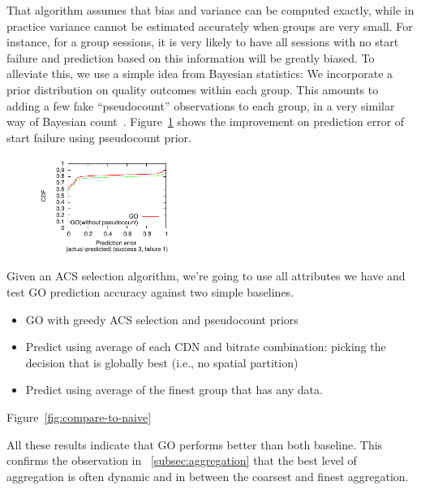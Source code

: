 That algorithm assumes that bias and variance can be computed exactly, while in practice variance cannot be estimated accurately when groups are very small. For instance, for a group sessions, it is very likely to have all sessions with no start failure and prediction based on this information will be greatly biased.
To alleviate this, we use a simple idea from Bayesian statistics: We incorporate a prior distribution on quality outcomes within each group.  This amounts to adding a few fake ``pseudocount'' observations to each group, in a very similar way of Bayesian count~\cite{}.  Figure~\ref{fig:sudocount} shows the improvement on prediction error of start failure using pseudocount prior.

\begin{figure}[h!]
\centering
 \includegraphics[width=0.4\textwidth] {figures/prediction-comparisons/example-pcount-metric3.pdf}
\label{fig:sudocount}
\end{figure}


Given an ACS selection algorithm, we're going to use all attributes we have and test GO prediction accuracy against two simple baselines.
\begin{itemize}
	\item GO with greedy ACS selection and pseudocount priors
	\item Predict using average of each CDN and bitrate combination: picking the decision that is globally best (i.e., no spatial partition)
	\item Predict using average of the finest group that has any data.
\end{itemize}
Figure~\ref{fig:compare-to-naive}


All these results indicate that GO performs better than both baseline. This confirms the observation in \Section~\ref{subsec:aggregation} that the best level of aggregation is often dynamic and in between the coarsest and finest aggregation.

